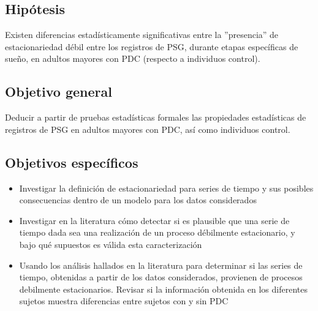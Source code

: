 
\subsection{Hip\'otesis}

Existen diferencias estad\'isticamente significativas entre 
la ''presencia'' de estacionariedad d\'ebil entre
los registros de PSG,
durante etapas espec\'ificas de sue\~no, en adultos
mayores con PDC (respecto a individuos control).


\subsection{Objetivo general}

Deducir a partir de pruebas estad\'isticas formales las propiedades
estad\'isticas de registros de PSG en adultos mayores con PDC, as\'i como individuos control.


\subsection{Objetivos espec\'ificos}

\begin{itemize}
\item Investigar la definici\'on de estacionariedad para series de tiempo
y sus posibles consecuencias dentro
de un modelo para los datos considerados

\item Investigar en la literatura c\'omo detectar si es plausible que una serie de tiempo 
dada sea una realizaci\'on de un proceso d\'ebilmente estacionario, 
y bajo qu\'e supuestos es v\'alida esta caracterizaci\'on

\item Usando los an\'alisis hallados en la literatura para determinar si las series de tiempo,
obtenidas a partir de los datos considerados, provienen de procesos
debilmente estacionarios.
Revisar si la informaci\'on obtenida en los diferentes sujetos muestra diferencias entre
sujetos con y sin PDC


\end{itemize}

